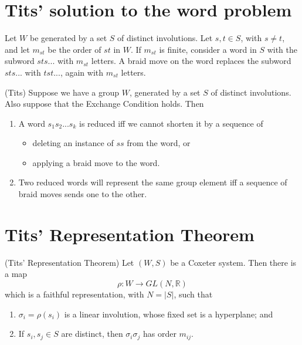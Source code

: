 \documentclass[12pt]{article}
\begin{document}
\section{Tits' solution to the word problem}

\begin{definition}
    Let $W$ be generated by a set $S$ of distinct involutions. Let $s,t\in S$, with $s\neq t$, and let $m_{st}$ be the order of $st$ in $W$. If $m_{st}$ is finite, consider a word in $S$ with the subword $sts...$ with $m_{st}$ letters. A braid move on the word replaces the subword $sts...$ with $tst...$, again with $m_{st}$ letters. 
\end{definition}

\begin{theorem}
    (Tits) Suppose we have a group $W$, generated by a set $S$ of distinct involutions. Also suppose that the Exchange Condition holds. Then
    \begin{enumerate}
        \item A word $s_1s_2...s_k$ is reduced iff we cannot shorten it by a sequence of 
        \begin{itemize}
            \item deleting an instance of $ss$ from the word, or
            \item applying a braid move to the word.
        \end{itemize}
        \item Two reduced words will represent the same group element iff a sequence of braid moves sends one to the other.
    \end{enumerate}
\end{theorem}


\section{Tits' Representation Theorem}
\begin{theorem}
    (Tits' Representation Theorem) Let $(W,S)$ be a Coxeter system. Then there is a map
    \[\rho : W \longrightarrow GL(N,\mathbb{R})\]
    which is a faithful representation, with $N=|S|$, such that
    \begin{enumerate}
        \item $\sigma_i = \rho (s_i)$ is a linear involution, whose fixed set is a hyperplane; and 
        \item If $s_i,s_j\in S$ are distinct, then $\sigma_i\sigma_j$ has order $m_{ij}$.  
    \end{enumerate}
\end{theorem}
\end{document}
